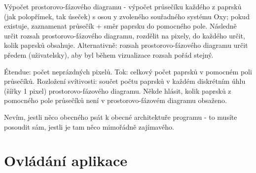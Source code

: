 Výpočet prostorovo-fázového diagramu - výpočet průsečíku každého z
paprsků (jak polopřímek, tak úseček) s osou y zvoleného souřadného
systému Oxy; pokud existuje, zaznamenat průsečík + směr paprsku do
pomocného pole. Následně určit rozsah prostorovo-fázového diagramu,
rozdělit na pixely, do každého určit, kolik paprsků obsahuje.
Alternativně: rozsah prostorovo-fázového diagramu určit předem
(uživatelsky), aby byl během vizualizace rozsah pořád stejný.

Étendue: počet neprázdných pixelů. Tok: celkový počet paprsků v pomocném
poli průsečíků. Rozložení svítivosti: součet počtu paprsků v každém
diskrétním úhlu (šířky 1 pixel) prostorovo-fázového diagramu. Někde
hlásit, kolik paprsků z pomocného pole průsečíků není v
prostorovo-fázovém diagramu obsaženo.

Nevím, jestli něco obecného psát k obecné architektuře programu - to
musíte posoudit sám, jestli je tam něco mimořádně zajímavého.



%
%



\section{Ovládání aplikace}





